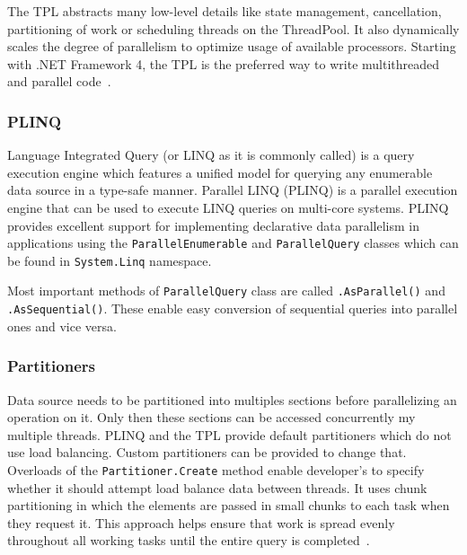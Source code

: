 The TPL abstracts many low-level details like state management, cancellation, partitioning of work or scheduling threads on the ThreadPool. It also dynamically scales the degree of parallelism to optimize usage of available processors. Starting with .NET Framework 4, the TPL is the preferred way to write multithreaded and parallel code~\cite{Leijen2009}.

\subsubsection{PLINQ}
\label{sec:PLINQ}
Language Integrated Query (or LINQ as it is commonly called) is a query execution engine which features a unified model for querying any enumerable data source in a type-safe manner. Parallel LINQ (PLINQ) is a parallel execution engine that can be used to execute LINQ queries on multi-core systems. PLINQ provides excellent support for implementing declarative data parallelism in applications using the \texttt{ParallelEnumerable} and \texttt{ParallelQuery} classes which can be found in \texttt{System.Linq} namespace.

Most important methods of \texttt{ParallelQuery} class are called \texttt{.AsParallel()} and \texttt{.AsSequential()}. These enable easy conversion of sequential queries into parallel ones and vice versa.

\subsubsection{Partitioners}
\label{sec:Partitioners}
Data source needs to be partitioned into multiples sections before parallelizing an operation on it. Only then these sections can be accessed concurrently my multiple threads. PLINQ and the TPL provide default partitioners which do not use load balancing. Custom partitioners can be provided to change that. Overloads of the \texttt{Partitioner.Create} method enable developer's to specify whether it should attempt load balance data between threads. It uses chunk partitioning in which the elements are passed in small chunks to each task when they request it. This approach helps ensure that work is spread evenly throughout all working tasks until the entire query is completed~\cite{Partitioners}.

